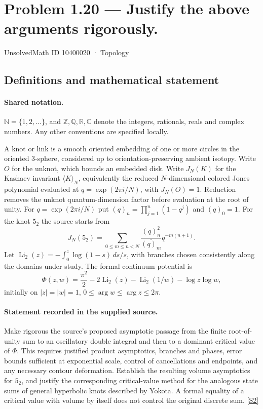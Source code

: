 \documentclass[11pt]{article}
\newcommand{\sref}[2]{\hyperlink{source:#1:#2}{[S#2]}}
\begin{document}
\setcounter{section}{10400019}
\section{Problem 1.20 — Justify the above arguments rigorously.}\label{10400020}
{\small\sffamily UnsolvedMath ID 10400020 · Topology}
\subsection{Definitions and mathematical statement}

\paragraph{Shared notation.}$\mathbb N=\{1,2,\ldots\}$, and $\mathbb Z,\mathbb Q,\mathbb R,\mathbb C$ denote the integers, rationals, reals and complex numbers. Any other conventions are specified locally.


A knot or link is a smooth oriented embedding of one or more circles in the oriented $3$-sphere, considered up to orientation-preserving ambient isotopy. Write $O$ for the unknot, which bounds an embedded disk. Write $J_N(K)$ for the Kashaev invariant $\langle K\rangle_N$, equivalently the reduced $N$-dimensional colored Jones polynomial evaluated at $q=\exp(2\pi i/N)$, with $J_N(O)=1$. Reduction removes the unknot quantum-dimension factor before evaluation at the root of unity. For $q=\exp(2\pi i/N)$ put $(q)_n=\prod_{j=1}^n(1-q^j)$ and $(q)_0=1$. For the knot $5_2$ the source starts from
\[J_N(5_2)=\sum_{0\le m\le n<N}\frac{(q)_n^2}{\overline{(q)_m}}q^{-m(n+1)}.\]
Let $\operatorname{Li}_2(z)=-\int_0^z\log(1-s)\,ds/s$, with branches chosen consistently along the domains under study. The formal continuum potential is
\[\Phi(z,w)=\frac{\pi^2}{2}-2\operatorname{Li}_2(z)-\operatorname{Li}_2(1/w)-\log z\log w,\]
initially on $|z|=|w|=1$, $0\le\arg w\le\arg z\le2\pi$.
\paragraph{Statement recorded in the supplied source.}
Make rigorous the source's proposed asymptotic passage from the finite root-of-unity sum to an oscillatory double integral and then to a dominant critical value of $\Phi$. This requires justified product asymptotics, branches and phases, error bounds sufficient at exponential scale, control of cancellations and endpoints, and any necessary contour deformation. Establish the resulting volume asymptotics for $5_2$, and justify the corresponding critical-value method for the analogous state sums of general hyperbolic knots described by Yokota. A formal equality of a critical value with volume by itself does not control the original discrete sum. \sref{10400020}{2}
\end{document}
